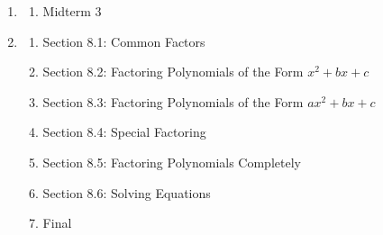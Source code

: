 \documentclass{ximera}
\begin{document}
\begin{enumerate}
\begin{enumerate}
        \item Section 7.2: Multiplication of Monomials
        \item Section 7.3: Multiplication of Polynomials
        \item Section 7.4: Integer Exponents and Scientific Notation
        \item Section 7.5: Division of Polynomials
    \end{enumerate}
    \item 
    \begin{enumerate}
        \item Midterm 3
    \end{enumerate}
    \item 
    \begin{enumerate}
        \item Section 8.1: Common Factors
        \item Section 8.2: Factoring Polynomials of the Form $x^{2}+b x+c$
        \item Section 8.3: Factoring Polynomials of the Form $a x^{2}+b x+c$
        \item Section 8.4: Special Factoring
        \item Section 8.5: Factoring Polynomials Completely
        \item Section 8.6: Solving Equations
        \item Final
    \end{enumerate}
\end{enumerate}
\end{document}
